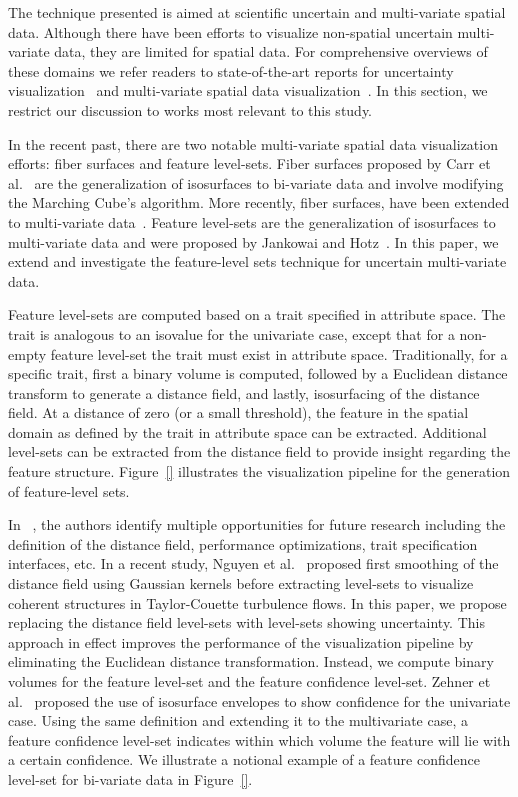The technique presented is aimed at scientific uncertain and multi-variate spatial data.
%
Although there have been efforts to visualize non-spatial uncertain multi-variate data, they are limited for spatial data.
%
For comprehensive overviews of these domains we refer readers to state-of-the-art reports for uncertainty visualization~\cite{Bonneau2014} and multi-variate spatial data visualization~\cite{he2019multivariate}.
%
In this section, we restrict our discussion to works most relevant to this study.

In the recent past, there are two notable multi-variate spatial data visualization efforts: fiber surfaces and feature level-sets.
%
Fiber surfaces proposed by Carr et al.~\cite{carr2015fiber} are the generalization of isosurfaces to bi-variate data and involve modifying the Marching Cube's algorithm.
%
More recently, fiber surfaces, have been extended to multi-variate data~\cite{blecha2020fiber}.
%
Feature level-sets are the generalization of isosurfaces to multi-variate data and were proposed by Jankowai and Hotz~\cite{jankowai2020feature}.
%
In this paper, we extend and investigate the feature-level sets technique for uncertain multi-variate data. 

Feature level-sets are computed based on a trait specified in attribute space.
%
The trait is analogous to an isovalue for the univariate case, except that for a non-empty feature level-set the trait must exist in attribute space.
%
Traditionally, for a specific trait, first a binary volume is computed, followed by a Euclidean distance transform to generate a distance field, and lastly, isosurfacing of the distance field.
%
At a distance of zero (or a small threshold), the feature in the spatial domain as defined by the trait in attribute space can be extracted.
%
Additional level-sets can be extracted from the distance field to provide insight regarding the feature structure.
%
Figure~\ref{} illustrates the visualization pipeline for the generation of feature-level sets.

In ~\cite{jankowai2020feature}, the authors identify multiple opportunities for future research including the definition of the distance field, performance optimizations, trait specification interfaces, etc.
%
In a recent study, Nguyen et al.~\cite{nguyen2020visualization} proposed first smoothing of the distance field using Gaussian kernels before extracting level-sets to visualize coherent structures in Taylor-Couette turbulence flows.
%
In this paper, we propose replacing the distance field level-sets with level-sets showing uncertainty. 
%
This approach in effect improves the performance of the visualization pipeline by eliminating the Euclidean distance transformation.
%
Instead, we compute binary volumes for the feature level-set and the feature confidence level-set. 
%
Zehner et al.~\cite{zehner2010visualization} proposed the use of isosurface envelopes to show confidence for the univariate case.
%
Using the same definition and extending it to the multivariate case, a feature confidence level-set indicates within which volume the feature will lie with a certain confidence.
%
We illustrate a notional example of a feature confidence level-set for bi-variate data in Figure~\ref{}.
